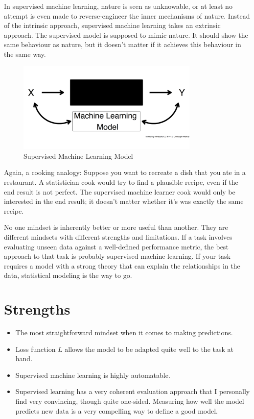 \documentclass[
  10pt,
]{scrbook}
\providecommand{\tightlist}{%
  \setlength{\itemsep}{0pt}\setlength{\parskip}{0pt}}
\begin{document}
In supervised machine learning, nature is seen as unknowable, or at least no attempt is even made to reverse-engineer the inner mechanisms of nature.
Instead of the intrinsic approach, supervised machine learning takes an extrinsic approach.
The supervised model is supposed to mimic nature.
It should show the same behaviour as nature, but it doesn't matter if it achieves this behaviour in the same way.

\begin{figure}

{\centering \includegraphics[width=0.8\textwidth]{figures/supervised-1} 

}

\caption{Supervised Machine Learning Model}\label{fig:supervised}
\end{figure}

Again, a cooking analogy:
Suppose you want to recreate a dish that you ate in a restaurant.
A statistician cook would try to find a plausible recipe, even if the end result is not perfect.
The supervised machine learner cook would only be interested in the end result;
it doesn't matter whether it's was exactly the same recipe.

No one mindset is inherently better or more useful than another.
They are different mindsets with different strengths and limitations.
If a task involves evaluating unseen data against a well-defined performance metric, the best approach to that task is probably supervised machine learning.
If your task requires a model with a strong theory that can explain the relationships in the data, statistical modeling is the way to go.

\hypertarget{strengths-6}{%
\section{Strengths}\label{strengths-6}}

\begin{itemize}
\tightlist
\item
  The most straightforward mindset when it comes to making predictions.
\item
  Loss function \(L\) allows the model to be adapted quite well to the task at hand.
\item
  Supervised machine learning is highly automatable.
\item
  Supervised learning has a very coherent evaluation approach that I personally find very convincing, though quite one-sided. Measuring how well the model predicts new data is a very compelling way to define a good model.
\end{itemize}
\end{document}
